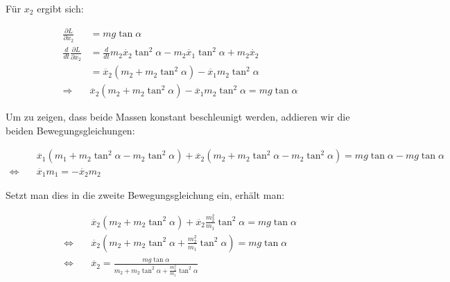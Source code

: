 \documentclass[a4paper,german,12pt,smallheadings]{scrartcl}
\begin{document}
Für $x_2$ ergibt sich:

\begin{align*}
  \frac{\partial L}{\partial x_2} &= mg \tan \alpha \\
  \frac{d}{dt}\frac{\partial L}{\partial \dot{x_2}} &= \frac{d}{dt} m_2\dot{x_2} \tan^2 \alpha - m_2 \dot{x_1} \tan^2 \alpha + m_2\dot{x_2} \\
  &= \ddot{x_2}(m_2+m_2 \tan^2 \alpha) - \ddot{x_1} m_2 \tan^2 \alpha \\
  \Rightarrow\quad &\ddot{x_2}(m_2+m_2 \tan^2 \alpha) - \ddot{x_1} m_2 \tan^2 \alpha = mg \tan \alpha
\end{align*}

Um zu zeigen, dass beide Massen konstant beschleunigt werden, addieren wir die beiden Bewegungsgleichungen:

\begin{align*}
&\ddot{x_1}(m_1+m_2 \tan^2 \alpha -m_2 \tan^2 \alpha)+\ddot{x_2}(m_2+m_2 \tan^2 \alpha - m_2 \tan^2 \alpha)=mg \tan \alpha - mg \tan \alpha \\
\Leftrightarrow\quad & \ddot{x_1} m_1 = -\ddot{x_2} m_2
\end{align*}

Setzt man dies in die zweite Bewegungsgleichung ein, erhält man:

\begin{align*}
  &\ddot{x_2}(m_2+m_2 \tan^2 \alpha) + \ddot{x_2} \frac{m_2^2}{m_1} \tan^2 \alpha = mg \tan \alpha \\
  \Leftrightarrow \quad &\ddot{x_2} (m_2+m_2 \tan^2 \alpha + \frac{m_2^2}{m_1} \tan^2 \alpha) = mg \tan \alpha \\
  \Leftrightarrow \quad &\ddot{x_2} = \frac{mg \tan \alpha}{m_2+m_2 \tan^2 \alpha + \frac{m_2^2}{m_1} \tan^2 \alpha}
\end{align*}
\end{document}

